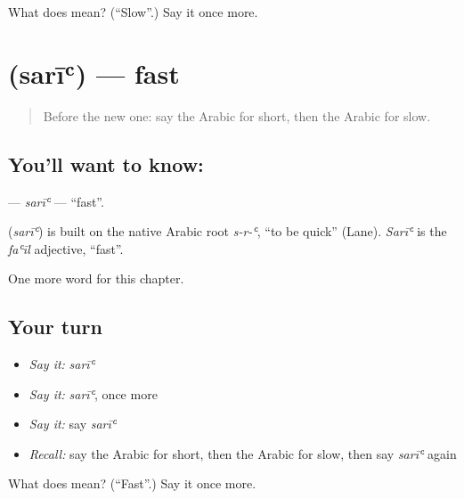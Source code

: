 \begin{tcolorbox}[breakable,colback=teal!4,colframe=teal!35!black,title={Before you move on}]
What does  mean? (\textquotedblleft{}Slow\textquotedblright{}.) Say it once more.
\end{tcolorbox}
\section[\texorpdfstring{\ar{سريع} (sarīʿ)}{سريع (sarīʿ)}]{ (sarīʿ) — fast}

\label{lesson:AR-C83-sari}



\begin{quote}
Before the new one: say the Arabic for short, then the Arabic for slow.
\end{quote}

\subsection*{You'll want to know: }
\textbf{} — \emph{sarīʿ} — \textquotedblleft{}fast\textquotedblright{}.

\begin{cousinweb}
\textbf{} (\emph{sarīʿ}) is built on the native Arabic root \emph{s-r-ʿ}, \textquotedblleft{}to be quick\textquotedblright{} (Lane). \emph{Sarīʿ} is the \emph{faʿīl} adjective, \textquotedblleft{}fast\textquotedblright{}.
\end{cousinweb}

\begin{grammarlens}[title={What you've built}]
One more word for this chapter.
\end{grammarlens}

\subsection*{Your turn}
\begin{itemize}
\raggedright
  \item \emph{Say it:} \emph{sarīʿ}
  \item \emph{Say it:} \emph{sarīʿ}, once more
  \item \emph{Say it:} say \emph{sarīʿ}
  \item \emph{Recall:} say the Arabic for short, then the Arabic for slow, then say \emph{sarīʿ} again
\end{itemize}

\begin{tcolorbox}[breakable,colback=teal!4,colframe=teal!35!black,title={Before you move on}]
What does  mean? (\textquotedblleft{}Fast\textquotedblright{}.) Say it once more.
\end{tcolorbox}
